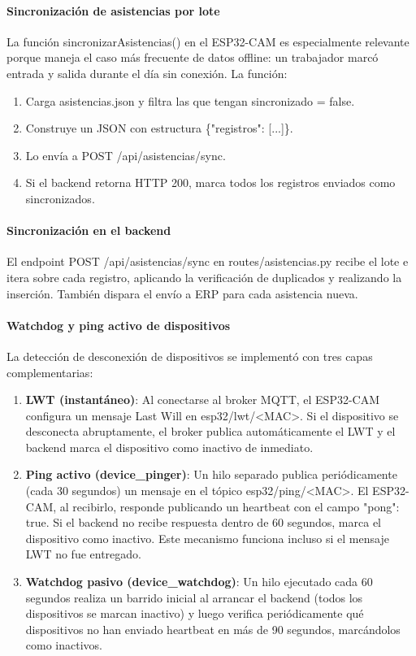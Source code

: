 \paragraph{Sincronización de asistencias por lote}

La función sincronizarAsistencias() en el ESP32-CAM es especialmente relevante porque maneja el caso más frecuente de datos offline: un trabajador marcó entrada y salida durante el día sin conexión. La función:

\begin{enumerate}
    \item Carga asistencias.json y filtra las que tengan sincronizado = false.
    \item Construye un JSON con estructura \{"registros": [...]\}.
    \item Lo envía a POST /api/asistencias/sync.
    \item Si el backend retorna HTTP 200, marca todos los registros enviados como sincronizados.
\end{enumerate}

\paragraph{Sincronización en el backend}

El endpoint POST /api/asistencias/sync en routes/asistencias.py recibe el lote e itera sobre cada registro, aplicando la verificación de duplicados y realizando la inserción. También dispara el envío a ERP para cada asistencia nueva.

\paragraph{Watchdog y ping activo de dispositivos}

La detección de desconexión de dispositivos se implementó con tres capas complementarias:

\begin{enumerate}
    \item \textbf{LWT (instantáneo)}: Al conectarse al broker MQTT, el ESP32-CAM configura un mensaje Last Will en esp32/lwt/<MAC>. Si el dispositivo se desconecta abruptamente, el broker publica automáticamente el LWT y el backend marca el dispositivo como inactivo de inmediato.
    \item \textbf{Ping activo (device\_pinger)}: Un hilo separado publica periódicamente (cada 30 segundos) un mensaje en el tópico esp32/ping/<MAC>. El ESP32-CAM, al recibirlo, responde publicando un heartbeat con el campo "pong": true. Si el backend no recibe respuesta dentro de 60 segundos, marca el dispositivo como inactivo. Este mecanismo funciona incluso si el mensaje LWT no fue entregado.
    \item \textbf{Watchdog pasivo (device\_watchdog)}: Un hilo ejecutado cada 60 segundos realiza un barrido inicial al arrancar el backend (todos los dispositivos se marcan inactivo) y luego verifica periódicamente qué dispositivos no han enviado heartbeat en más de 90 segundos, marcándolos como inactivos.
\end{enumerate}

